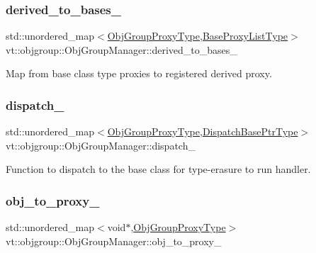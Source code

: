 \subsubsection{\texorpdfstring{derived\+\_\+to\+\_\+bases\+\_\+}{derived\_to\_bases\_}}
{\footnotesize\ttfamily std\+::unordered\+\_\+map$<$\hyperlink{namespacevt_ad7cae989df485fccca57f0792a880a8e}{Obj\+Group\+Proxy\+Type},\hyperlink{structvt_1_1objgroup_1_1_obj_group_manager_a497383a759f7426e824b4f7475b3d5d3}{Base\+Proxy\+List\+Type}$>$ vt\+::objgroup\+::\+Obj\+Group\+Manager\+::derived\+\_\+to\+\_\+bases\+\_\+\hspace{0.3cm}{\ttfamily [private]}}



Map from base class type proxies to registered derived proxy. 

\mbox{\label{structvt_1_1objgroup_1_1_obj_group_manager_af0a909e8963f651ba854ef6199612960}} 
\subsubsection{\texorpdfstring{dispatch\+\_\+}{dispatch\_}}
{\footnotesize\ttfamily std\+::unordered\+\_\+map$<$\hyperlink{namespacevt_ad7cae989df485fccca57f0792a880a8e}{Obj\+Group\+Proxy\+Type},\hyperlink{structvt_1_1objgroup_1_1_obj_group_manager_a8f2ded4cfa63faa119c2bd550764878f}{Dispatch\+Base\+Ptr\+Type}$>$ vt\+::objgroup\+::\+Obj\+Group\+Manager\+::dispatch\+\_\+\hspace{0.3cm}{\ttfamily [private]}}



Function to dispatch to the base class for type-\/erasure to run handler. 

\mbox{\label{structvt_1_1objgroup_1_1_obj_group_manager_a3c305145bf02f4f7add709186a40695a}} 
\subsubsection{\texorpdfstring{obj\+\_\+to\+\_\+proxy\+\_\+}{obj\_to\_proxy\_}}
{\footnotesize\ttfamily std\+::unordered\+\_\+map$<$void$\ast$,\hyperlink{namespacevt_ad7cae989df485fccca57f0792a880a8e}{Obj\+Group\+Proxy\+Type}$>$ vt\+::objgroup\+::\+Obj\+Group\+Manager\+::obj\+\_\+to\+\_\+proxy\+\_\+\hspace{0.3cm}{\ttfamily [private]}}



